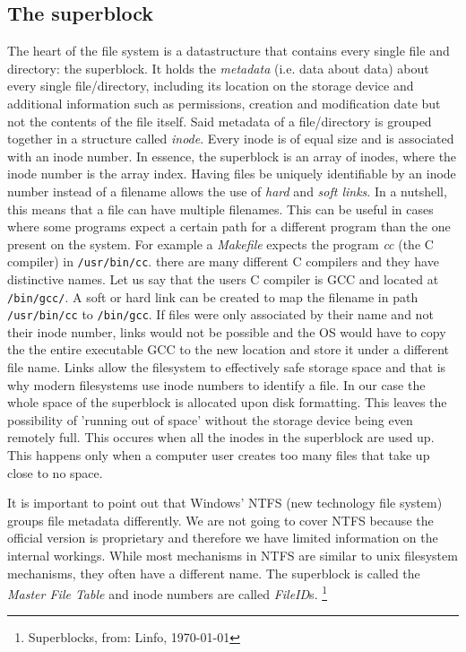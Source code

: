 \subsection{The superblock}

The heart of the file system is a datastructure that contains every single file and directory: the
superblock. It holds the \textit{metadata} (i.e. data about data) about every single file/directory,
including its location on the storage device and additional information such as permissions, creation
and modification date but not the contents of the file itself. Said metadata of a file/directory is
grouped together in a structure called \textit{inode}. Every inode is of equal size and is associated
with an inode number. In essence, the superblock is an array of inodes, where the inode number is the
array index. Having files be uniquely identifiable by an inode number instead of a filename allows 
the use of \textit{hard} and \textit{soft links}. In a nutshell, this means that a file can have multiple filenames.
This can be useful in cases where some programs expect a certain path for a different program than the
one present on the system. For example a \textit{Makefile} expects the program \textit{cc} (the C compiler) in
\texttt{/usr/bin/cc}. there are many different C compilers and they have distinctive names. Let us say that the
users C compiler is GCC and located at \texttt{/bin/gcc/}. A soft or hard link can be created to map the
filename in path \texttt{/usr/bin/cc} to \texttt{/bin/gcc}. If files were only associated by their name and not 
their inode number, links would not be possible and the OS would have to copy the the entire
executable GCC to the new location and store it under a different file name. Links allow the
filesystem to effectively safe storage space and that is why modern filesystems use inode numbers to
identify a file. In our case the whole space of the superblock is allocated upon disk formatting.
This leaves the possibility of 'running out of space' without the storage device being even remotely
full. This occures when all the inodes in the superblock are used up. This happens only when a
computer user creates too many files that take up close to no space.

It is important to point out that Windows' NTFS (new technology file system) groups file metadata differently. 
We are not going to cover NTFS because the official version is proprietary and therefore we have limited 
information on the internal workings. While most mechanisms in NTFS are similar to
unix filesystem mechanisms, they often have a different name. The superblock is called the \textit{Master
File Table} and inode numbers are called \textit{FileID}s. \footnote{Superblocks, from: Linfo, \today }

